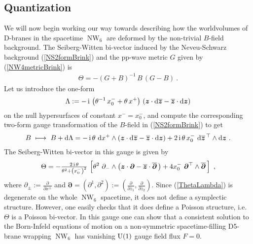 \documentclass[11pt,a4paper]{article}
\DeclareMathOperator{\NW}{NW}
\newcommand{\1}{\mathbb{1}}
\newcommand{\mbf}[1]{{\boldsymbol {#1} }}
\def\ii{{\,{\rm i}\,}}
\def\dd{{\rm d}}
\def\mz{{\mbf z}}
\def\mdell{{\mbf\partial}}
\newcommand{\beq}{\begin{eqnarray}}
\newcommand{\eeq}{\end{eqnarray}}
\begin{document}
\subsection{Quantization\label{NWQuant}}

We will now begin working our way towards describing how
the worldvolumes of D-branes in the spacetime $\NW_6$ are
deformed by the non-trivial $B$-field background. The Seiberg-Witten
bi-vector induced by the Neveu-Schwarz background (\ref{NS2formBrink})
and the pp-wave metric $G$ given by (\ref{NW4metricBrink}) is
\beq
\Theta=-(G+B)^{-1}\,B\,(G-B) \ .
\label{SWTheta}\eeq
Let us introduce the one-form
\beq
\Lambda:=-\ii\left(\theta^{-1}\,x_0^-+\theta\,x^+\right)\,\left(
\mz\cdot\dd\overline{\mz}-\overline{\mz}\cdot\dd\mz
\right)
\label{Lambdadef}\eeq
on the null hypersurfaces of constant $x^-=x_0^-$, and compute the
corresponding two-form gauge transformation of the $B$-field in
(\ref{NS2formBrink}) to get
\beq
B~\longmapsto~B+\dd\Lambda=-\ii\theta~\dd x^+\wedge\left(
\mz\cdot\dd\overline{\mz}-\overline{\mz}\cdot\dd\mz
\right)+2\ii\theta\,x_0^-~\dd\overline{\mz}{}^{\,\top}
\wedge\dd\mz \ .
\label{B6gaugeequiv}\eeq
The Seiberg-Witten bi-vector in this gauge is given by
\beq
\Theta=-\mbox{$\frac{2\ii\theta}{\theta^2+\left(x_0^-\right)^2}$}\,
\left[\theta^2~\partial_-\wedge\left(\mz\cdot\mdell-
\overline{\mz}\cdot\overline{\mdell}\,\right)+4x_0^-~
\mdell^\top\wedge\overline{\mdell}\,\right] \ ,
\label{ThetaLambda}\eeq
where $\partial_\pm:=\frac\partial{\partial x^\pm}$ and
$\mdell=(\partial^1,\partial^2):=(\frac\partial{\partial
  z_1},\frac\partial{\partial z_2})$. Since (\ref{ThetaLambda}) is
degenerate on the whole $\NW_6$ spacetime, it does not define a
symplectic structure. However, one easily checks that it does define a
Poisson structure, i.e. $\Theta$ is a Poisson bi-vector. In this gauge
one can show that a consistent solution to the Born-Infeld equations
of motion on a non-symmetric spacetime-filling D5-brane wrapping
$\NW_6$ has vanishing ${\rm U}(1)$ gauge field flux $F=0$.
\end{document}

